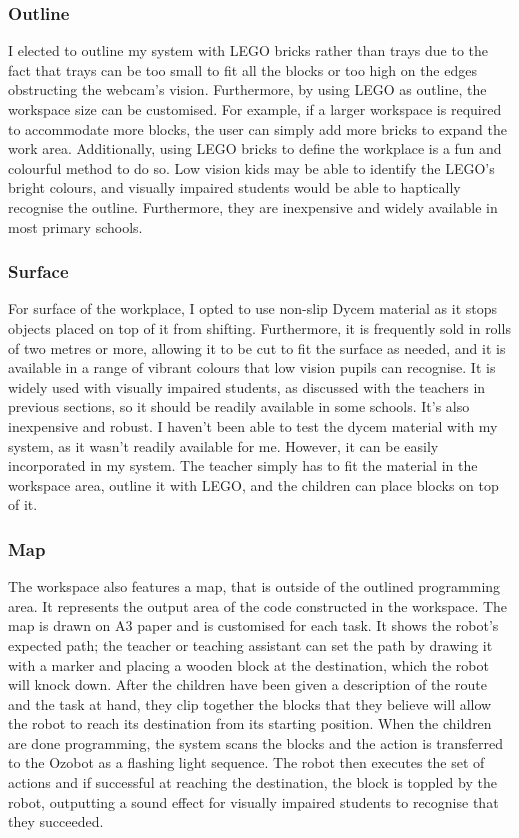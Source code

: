 \documentclass[oneside,%
                    author={Malak Hajji},
                    degree={BSc},
                    title={Designing An Accessible Ozobot Programming Platform for Students},
                  subtitle={With Mixed Visual Abilities}]{dissertation}
\begin{document}
\subsubsection{Outline}
I elected to outline my system with LEGO bricks rather than trays due to the fact that trays can be too small to fit all the blocks or too high on the edges obstructing the webcam's vision. Furthermore, by using LEGO as outline, the workspace size can be customised. For example, if a larger workspace is required to accommodate more blocks, the user can simply add more bricks to expand the work area. Additionally, using LEGO bricks to define the workplace is a fun and colourful method to do so. Low vision kids may be able to identify the LEGO's bright colours, and visually impaired students would be able to haptically recognise the outline. Furthermore, they are inexpensive and widely available in most primary schools.

\subsubsection{Surface}
For surface of the workplace, I opted to use non-slip Dycem material as it stops objects placed on top of it from shifting. Furthermore, it is frequently sold in rolls of two metres or more, allowing it to be cut to fit the surface as needed, and it is available in a range of vibrant colours that low vision pupils can recognise. It is widely used with visually impaired students, as discussed with the teachers in previous sections, so it should be readily available in some schools. It's also inexpensive and robust. I haven't been able to test the dycem material with my system, as it wasn't readily available for me. However, it can be easily incorporated in my system. The teacher simply has to fit the material in the workspace area, outline it with LEGO, and the children can place blocks on top of it. 
\subsubsection{Map}
The workspace also features a map, that is outside of the outlined programming area. It represents the output area of the code constructed in the workspace. 
The map is drawn on A3 paper and is customised for each task. It shows the robot's expected path; the teacher or teaching assistant can set the path by drawing it with a marker and placing a wooden block at the destination, which the robot will knock down. After the children have been given a description of the route and the task at hand, they clip together the blocks that they believe will allow the robot to reach its destination from its starting position. When the children are done programming, the system scans the blocks and the action is transferred to the Ozobot as a flashing light sequence. The robot then executes the set of actions and if successful at reaching the destination, the block is toppled by the robot, outputting a sound effect for visually impaired students to recognise that they succeeded. 
\end{document}
